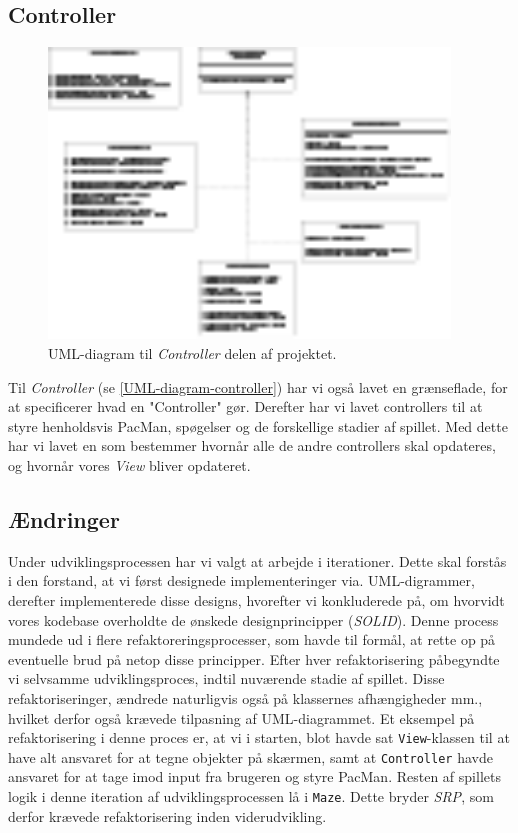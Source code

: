 \documentclass{article}
\newcommand{\code}[1]{\small\texttt{#1}}
\newcommand{\class}[1]{\textcolor{BlueViolet}{\small\ttfamily\seqsplit{#1}}}
\theoremstyle{mytheoremstyle}
\theoremstyle{mytheoremstyle}
\theoremstyle{myproblemstyle}
\begin{document}
\subsection{Controller}\label{sub:Controller} %
\begin{figure}[H]
    \begin{center}
        \includegraphics[width=0.95\textwidth]{figures/UML-diagram-controller.png}
    \end{center}
    \caption{UML-diagram til \textit{Controller} delen af projektet.}
    \label{UML-diagram-controller}
\end{figure}

Til \textit{Controller} (se \autoref{UML-diagram-controller}) har vi også lavet
en grænseflade, for at specificerer hvad en "Controller" gør. Derefter har vi
lavet controllers til at styre henholdsvis PacMan, spøgelser og de forskellige
stadier af spillet. Med dette har vi lavet en \class{MainController} som
bestemmer hvornår alle de andre controllers skal opdateres, og hvornår vores
\textit{View} bliver opdateret.


\subsection{Ændringer}\label{sub:Ændringer} %
Under udviklingsprocessen har vi valgt at arbejde i iterationer. Dette skal
forstås i den forstand, at vi først designede implementeringer via.
UML-digrammer, derefter implementerede disse designs, hvorefter vi konkluderede
på, om hvorvidt vores kodebase overholdte de ønskede designprincipper
(\textit{SOLID}). Denne process mundede ud i flere refaktoreringsprocesser, som
havde til formål, at rette op på eventuelle brud på netop disse principper.
Efter hver refaktorisering påbegyndte vi selvsamme udviklingsproces, indtil
nuværende stadie af spillet. Disse refaktoriseringer, ændrede naturligvis også
på klassernes afhængigheder mm., hvilket derfor også krævede tilpasning af
UML-diagrammet. Et eksempel på refaktorisering i denne proces er, at vi i
starten, blot havde sat \code{View}-klassen til at have alt ansvaret for at
tegne objekter på skærmen, samt at \code{Controller} havde ansvaret for at tage
imod input fra brugeren og styre PacMan. Resten af spillets logik i denne
iteration af udviklingsprocessen lå i \code{Maze}. Dette bryder \textit{SRP},
som derfor krævede refaktorisering inden viderudvikling.
\end{document}

